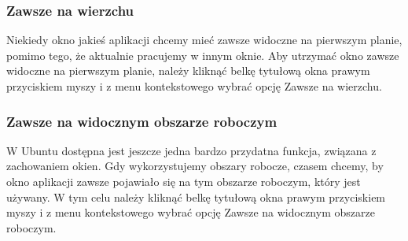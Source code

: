 \subsubsection{Zawsze na wierzchu}
Niekiedy okno jakieś aplikacji chcemy mieć zawsze widoczne na pierwszym planie, pomimo tego, że aktualnie pracujemy w innym oknie. Aby utrzymać okno zawsze widoczne na pierwszym planie, należy kliknąć belkę tytułową okna prawym przyciskiem myszy i z menu kontekstowego wybrać opcję \textcolor{ubuntu_orange}{Zawsze na wierzchu}.

\subsubsection{Zawsze na widocznym obszarze roboczym}
W Ubuntu dostępna jest jeszcze jedna bardzo przydatna funkcja, związana z zachowaniem okien. Gdy wykorzystujemy obszary robocze, czasem chcemy, by okno aplikacji zawsze pojawiało się na tym obszarze roboczym, który jest używany. W tym celu należy kliknąć belkę tytułową okna prawym przyciskiem myszy i z menu kontekstowego wybrać opcję \textcolor{ubuntu_orange}{Zawsze na widocznym obszarze roboczym}.
